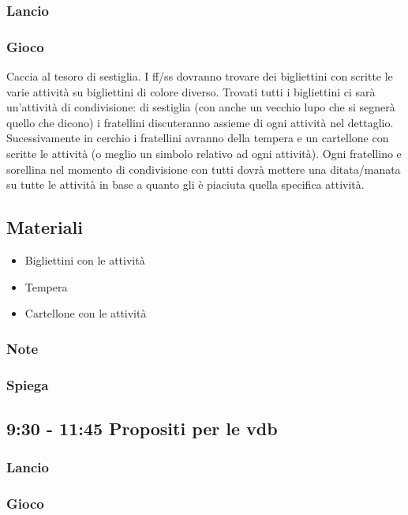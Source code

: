 \documentclass[../main.tex]{subfiles}
\begin{document}
    \subsubsection{Lancio}
    \subsubsection{Gioco}
    Caccia al tesoro di sestiglia. I ff/ss dovranno trovare dei bigliettini con scritte le varie attività su bigliettini di colore diverso.
Trovati tutti i bigliettini ci sarà un'attività di condivisione: di sestiglia (con anche un vecchio lupo che si segnerà quello che dicono) i fratellini discuteranno assieme di ogni attività nel dettaglio.
Sucessivamente in cerchio i fratellini avranno della tempera e un cartellone con scritte le attività (o meglio un simbolo relativo ad ogni attività). Ogni fratellino e sorellina nel momento di condivisione con tutti dovrà mettere una ditata/manata su tutte le attività in base a quanto gli è piaciuta quella specifica attività.
    \subsection{Materiali}
    \begin{itemize}
        \item Bigliettini con le attività
        \item Tempera
        \item Cartellone con le attività
    \end{itemize}
    \subsubsection{Note}
    \subsubsection{Spiega}
    
        \subsection{9:30 - 11:45 Propositi per le vdb}
    \subsubsection{Lancio}
    \subsubsection{Gioco}
 
\end{document}
